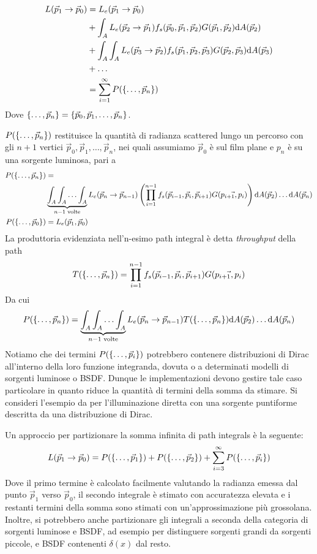 \begin{align}
	L(\vec{p}_1\to\vec{p}_0)&=L_e(\vec{p}_1\to\vec{p}_0) \nonumber \\
		&+\int_{A}L_e(\vec{p}_2\to\vec{p}_1)f_s(\vec{p}_0,\vec{p}_1,\vec{p}_2)G(\vec{p}_1,\vec{p}_2)\mathrm{d}A(\vec{p}_2) \nonumber \\
		&+\int_{A}\int_{A}L_e(\vec{p}_3\to\vec{p}_2)f_s(\vec{p}_1,\vec{p}_2,\vec{p}_3)G(\vec{p}_2,\vec{p}_3)\mathrm{d}A(\vec{p}_3) \nonumber \\
		&+\ldots \nonumber \\
		&=\sum_{i=1}^\infty P(\{\ldots,\vec{p}_{n}\})
\end{align}
Dove $\{\ldots,\vec{p}_{n}\}=\{\vec{p}_0,\vec{p}_1,\ldots,\vec{p}_n\}$.\par
$P(\{\ldots,\vec{p}_{n}\})$ restituisce la quantit\`a di radianza scattered lungo un percorso con 
gli $n+1$ vertici $\vec{p}_0,\vec{p}_1,\ldots,\vec{p}_n$, nei quali assumiamo $\vec{p}_0$ \`e sul film plane e $p_n$ \`e su una sorgente luminosa, 
pari a 
\begin{align}
	P(\ptset{n}) &= \nonumber\\&\underbrace{\int_A\int_A\ldots\int_A}_{n-1\text{ volte}}L_e(\vec{p}_n\to\vec{p}_{n-1})\left(\prod_{i=1}^{n-1}%
		f_s(\vec{p}_{i-1},\vec{p}_i,\vec{p}_{i+1})G(\vec{p_{i+1},p_{i}})\right)\mathrm{d}A(\vec{p}_2)\ldots\mathrm{d}A(\vec{p}_n) \\
	P(\ptset{0}) &= L_e(\vec{p}_1,\vec{p}_0) \nonumber
\end{align}
La produttoria evidenziata nell'n-esimo path integral \`e detta \textit{throughput} della path
\begin{equation}
	T(\{\ldots,\vec{p}_{n}\})=\prod_{i=1}^{n-1}f_s(\vec{p}_{i-1},\vec{p}_i,\vec{p}_{i+1})G(\vec{p_{i+1},p_{i}})
\end{equation}
Da cui 
\begin{equation}
	P(\ptset{n}) = \underbrace{\int_A\int_A\ldots\int_A}_{n-1\text{ volte}}L_e(\vec{p}_n\to\vec{p}_{n-1})T(\ptset{n})%
		\mathrm{d}A(\vec{p}_2)\ldots\mathrm{d}A(\vec{p}_n)
\end{equation}
Notiamo che dei termini $P(\{\ldots,\vec{p}_{i}\})$ potrebbero contenere distribuzioni di Dirac all'interno della loro funzione integranda, dovuta o a determinati 
modelli di sorgenti luminose o BSDF. Dunque le implementazioni devono gestire tale caso particolare in quanto riduce la quantit\`a di termini della 
somma da stimare. Si consideri l'esempio da \cite{pharr} per l'illuminazione diretta con una sorgente puntiforme descritta da una distribuzione di 
Dirac.\par
Un approccio per partizionare la somma infinita di path integrals \`e la seguente:
\begin{equation}
	L(\vec{p}_1\to\vec{p}_0)=P(\{\ldots,\vec{p}_{1}\})+P(\{\ldots,\vec{p}_{2}\})+\sum_{i=3}^\infty P(\{\ldots,\vec{p}_{i}\})
\end{equation}
Dove il primo termine \`e calcolato facilmente valutando la radianza emessa dal punto $\vec{p}_1$ verso $\vec{p}_0$, il secondo integrale \`e stimato 
con accuratezza elevata e i restanti termini della somma sono stimati con un'approssimazione pi\`u grossolana. Inoltre, si potrebbero anche partizionare
gli integrali a seconda della categoria di sorgenti luminose e BSDF, ad esempio per distinguere sorgenti grandi da sorgenti piccole, e BSDF contenenti
$\delta(x)$ dal resto.
